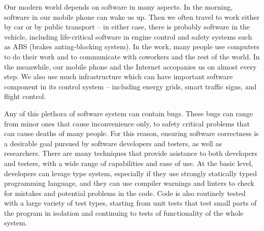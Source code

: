 Our modern world depends on software in many aspects.
In the morning, software in our mobile phone can wake us up.
Then we often travel to work either by car or by public transport -- in either case, there is probably software in the vehicle, including life-critical software in engine control and safety systems such as ABS (brakes anting-blocking system).
In the work, many people use computers to do their work and to communicate with coworkers and the rest of the world.
In the meanwhile, our mobile phone and the Internet accopanies us on almost every step.
We also use much infrastructure which can have important software component in its control system -- including energy grids, smart traffic signs, and flight control.

Any of this plethora of software system can contain bugs.
These bugs can range from minor ones that cause inconvenience only, to safety critical problems that can cause deaths of many people.
For this reason, ensuring software correctness is a desirable goal pursued by software developers and testers, as well as researchers.
There are many techniques that provide asistance to both developers and testers, with a wide range of capabilities and ease of use.
At the basic level, developers can levage type system, especially if they use strongly statically typed programming language, and they can use compiler warnings and linters to check for mistakes and potential problems in the code.
Code is also routinely tested with a large variety of test types, starting from unit tests that test small parts of the program in isolation and continuing to tests of functionality of the whole system.

